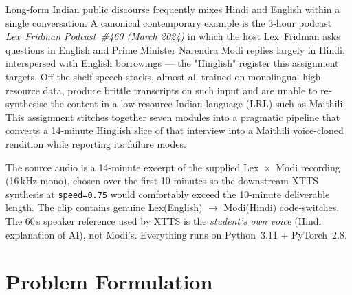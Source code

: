 \documentclass[conference]{IEEEtran}
\begin{document}
Long-form Indian public discourse frequently mixes Hindi and English within
a single conversation. A canonical contemporary example is the 3-hour
podcast \textit{Lex~Fridman Podcast~\#460 (March 2024)} in which the host
Lex~Fridman asks questions in English and Prime Minister Narendra Modi
replies largely in Hindi, interspersed with English borrowings --- the
"Hinglish" register this assignment targets. Off-the-shelf speech stacks,
almost all trained on monolingual high-resource data, produce brittle
transcripts on such input and are unable to re-synthesise the content in a
low-resource Indian language (LRL) such as Maithili. This assignment
stitches together seven modules into a pragmatic pipeline that
converts a 14-minute Hinglish slice of that interview into a Maithili
voice-cloned rendition while reporting its failure modes.

The source audio is a 14-minute excerpt of the supplied Lex~$\times$~Modi
recording (16\,kHz mono), chosen over the first 10 minutes so the downstream
XTTS synthesis at \texttt{speed=0.75} would comfortably exceed the 10-minute
deliverable length. The clip contains genuine Lex(English) $\rightarrow$
Modi(Hindi) code-switches. The 60\,s speaker reference used by XTTS is the
\emph{student's own voice} (Hindi explanation of AI), not Modi's.
Everything runs on Python~3.11 + PyTorch~2.8.

\section{Problem Formulation}
\end{document}
